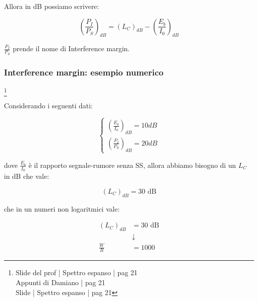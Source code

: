 Allora in dB possiamo scrivere: 

{
    \Large 
    \begin{equation}
        \left( \frac{P_I}{P_S}\right)_{dB}
        = 
        \left(L_C\right)_{dB}
        - 
        \left(\frac{E_b}{I_0}\right)_{dB}
    \end{equation}
}

$\frac{P_I}{P_S}$ prende il nome di Interference margin. \newline 

\newpage 

\subsubsection{Interference margin: esempio numerico}
\footnote{Slide del prof | Spettro espanso | pag 21 \\
Appunti di Damiano | pag 21 \\
Slide | Spettro espanso | pag 21 
} 


Considerando i seguenti dati: 

{
    \Large 
    \begin{equation}
        \begin{cases}
            \left(\frac{E_b}{I_0}\right)_{dB}
            = 
            10 dB 
            \\
            \left(\frac{P_I}{P_S}\right)_{dB}
            = 
            20 dB 
        \end{cases}
    \end{equation}
}

dove $\frac{E_b}{I_0}$ è il rapporto segnale-rumore senza SS, 
allora abbiamo bisogno di un $L_C$ in dB che vale: 

{
    \Large 
    \begin{equation}
        \left(L_C\right)_{dB} = 30 \text{ dB}
    \end{equation}
}

che in un numeri non logaritmici vale: 

{
    \Large 
    \begin{equation}
        \begin{split}
            \left(L_C\right)_{dB} &= 30 \text{ dB}
            \\
            &\downarrow
            \\
            \frac{W}{R} &= 1000
        \end{split}
    \end{equation}
}

